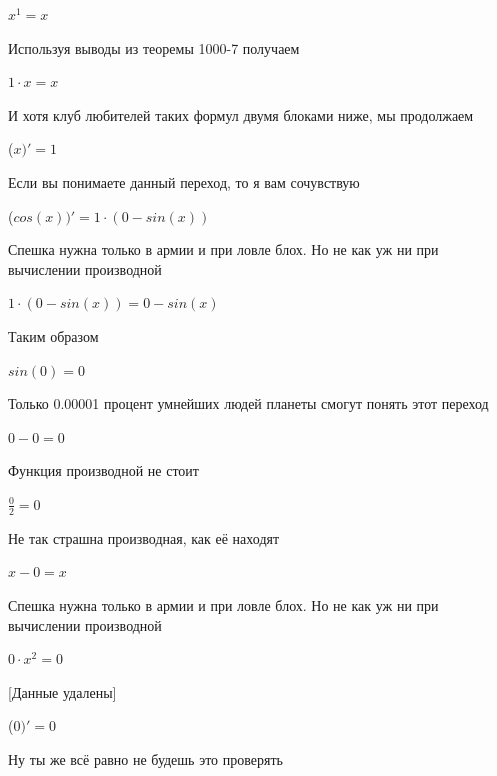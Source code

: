 \documentclass[12pt,a4paper,fleqn]{article}
\begin{document}
\begin{center}
$x^{1} = x$\end{center}
Используя выводы из теоремы 1000-7 получаем

\begin{center}
$1 \cdot x = x$\end{center}
И хотя клуб любителей таких формул двумя блоками ниже, мы продолжаем

\begin{center}
 ($x)'
  = 1$\end{center}
Если вы понимаете данный переход, то я вам сочувствую

\begin{center}
 ($cos(x))'
  = 1 \cdot (0-sin(x))$\end{center}
Спешка нужна только в армии и при ловле блох. Но не как уж ни при вычислении производной\cite{link2}

\begin{center}
$1 \cdot (0-sin(x)) = 0-sin(x)$\end{center}
Таким образом

\begin{center}
\end{center}
\begin{center}$sin(0) = 0$\end{center}
Только 0.00001 процент умнейших людей планеты смогут понять этот переход

\begin{center}
\end{center}
\begin{center}$0-0 = 0$\end{center}
Функция производной не стоит\cite{link2}

\begin{center}
\end{center}
\begin{center}$\frac{0}{2} = 0$\end{center}
Не так страшна производная, как её находят\cite{link2}

\begin{center}
$x-0 = x$\end{center}
Спешка нужна только в армии и при ловле блох. Но не как уж ни при вычислении производной\cite{link2}

\begin{center}
$0 \cdot x^{2} = 0$\end{center}
[Данные удалены]

\begin{center}
 ($0)'
  = 0$\end{center}
Ну ты же всё равно не будешь это проверять
\end{document}
